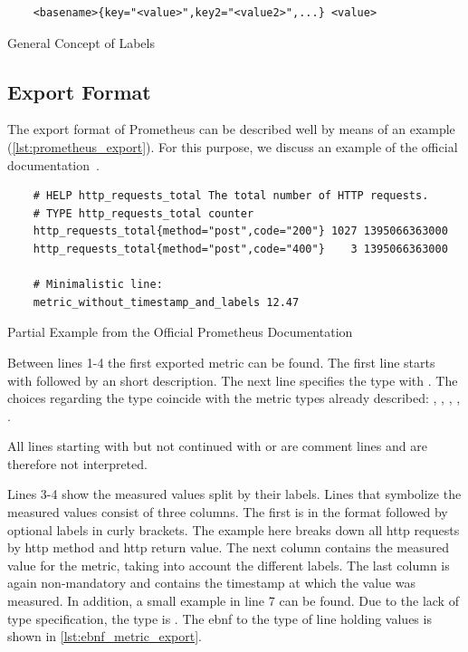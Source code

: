 \begin{listing}[!ht]
	\begin{verbatim}
	<basename>{key="<value>",key2="<value2>",...} <value>
	\end{verbatim}
	\caption{General Concept of Labels}
	\label{lst:concept_label}
\end{listing}

\subsection{Export Format}
\label{subsec:Exportformat}

The export format of Prometheus can be described well by means of an example (\cref{lst:prometheus_export}). For this purpose, we discuss an example of the official documentation~\cite{PrometheusExpositionFormatBeispiel}.

\begin{listing}[!ht]
	\begin{verbatim}
	# HELP http_requests_total The total number of HTTP requests.
	# TYPE http_requests_total counter
	http_requests_total{method="post",code="200"} 1027 1395066363000
	http_requests_total{method="post",code="400"}    3 1395066363000
	
	# Minimalistic line:
	metric_without_timestamp_and_labels 12.47
	\end{verbatim}
	\caption{Partial Example from the Official Prometheus Documentation~\cite{PrometheusExpositionFormatBeispiel}}
	\label{lst:prometheus_export}
\end{listing}

Between lines 1-4 the first exported metric can be found. The first line starts with  followed by an short description. The next line specifies the type with . The choices regarding the type coincide with the metric types already described: , , , , .

All lines starting with \promcode{#} but not continued with  or  are comment lines and are therefore not interpreted.

Lines 3-4 show the measured values split by their labels. Lines that symbolize the measured values consist of three columns. The first is in the format  followed by optional labels in curly brackets. The example here breaks down all \gls{http} requests by \gls{http} method and \gls{http} return value. The next column contains the measured value for the metric, taking into account the different labels. The last column is again non-mandatory and contains the timestamp at which the value was measured. 
In addition, a small example in line 7 can be found. Due to the lack of type specification, the type is . The \gls{ebnf} to the type of line holding values is shown in \cref{lst:ebnf_metric_export}.

